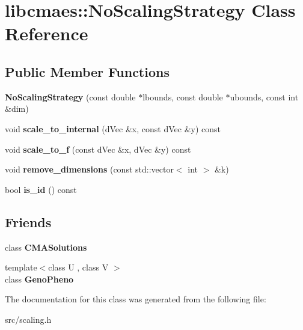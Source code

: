 \hypertarget{classlibcmaes_1_1NoScalingStrategy}{\section{libcmaes\+:\+:No\+Scaling\+Strategy Class Reference}
\label{classlibcmaes_1_1NoScalingStrategy}
}
\subsection*{Public Member Functions}
\begin{DoxyCompactItemize}
\item 
\hypertarget{classlibcmaes_1_1NoScalingStrategy_afa32ee30796e0daa71dacf0b39a24038}{{\bfseries No\+Scaling\+Strategy} (const double $\ast$lbounds, const double $\ast$ubounds, const int \&dim)}\label{classlibcmaes_1_1NoScalingStrategy_afa32ee30796e0daa71dacf0b39a24038}

\item 
\hypertarget{classlibcmaes_1_1NoScalingStrategy_a2cec97ec77df54410a5218d0fa24913c}{void {\bfseries scale\+\_\+to\+\_\+internal} (d\+Vec \&x, const d\+Vec \&y) const }\label{classlibcmaes_1_1NoScalingStrategy_a2cec97ec77df54410a5218d0fa24913c}

\item 
\hypertarget{classlibcmaes_1_1NoScalingStrategy_ae7c21e6a62a97a9fe4426923440750fc}{void {\bfseries scale\+\_\+to\+\_\+f} (const d\+Vec \&x, d\+Vec \&y) const }\label{classlibcmaes_1_1NoScalingStrategy_ae7c21e6a62a97a9fe4426923440750fc}

\item 
\hypertarget{classlibcmaes_1_1NoScalingStrategy_ab3039bddcdc531e9339bbc53858bd81a}{void {\bfseries remove\+\_\+dimensions} (const std\+::vector$<$ int $>$ \&k)}\label{classlibcmaes_1_1NoScalingStrategy_ab3039bddcdc531e9339bbc53858bd81a}

\item 
\hypertarget{classlibcmaes_1_1NoScalingStrategy_aeba83bd4114a292739d583a472fba92a}{bool {\bfseries is\+\_\+id} () const }\label{classlibcmaes_1_1NoScalingStrategy_aeba83bd4114a292739d583a472fba92a}

\end{DoxyCompactItemize}
\subsection*{Friends}
\begin{DoxyCompactItemize}
\item 
\hypertarget{classlibcmaes_1_1NoScalingStrategy_a78b1b9910ebce544de9b54b998e77879}{class {\bfseries C\+M\+A\+Solutions}}\label{classlibcmaes_1_1NoScalingStrategy_a78b1b9910ebce544de9b54b998e77879}

\item 
\hypertarget{classlibcmaes_1_1NoScalingStrategy_a30b6df18a1c8899440f1ca1273b26bb9}{{\footnotesize template$<$class U , class V $>$ }\\class {\bfseries Geno\+Pheno}}\label{classlibcmaes_1_1NoScalingStrategy_a30b6df18a1c8899440f1ca1273b26bb9}

\end{DoxyCompactItemize}


The documentation for this class was generated from the following file\+:\begin{DoxyCompactItemize}
\item 
src/scaling.\+h\end{DoxyCompactItemize}
